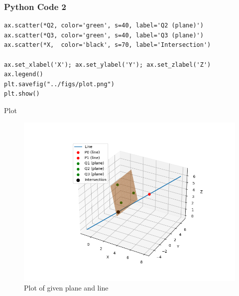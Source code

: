\documentclass{beamer}
\begin{document}
\begin{frame}[fragile]
    \frametitle{Python Code 2}
    \begin{lstlisting}
ax.scatter(*Q2, color='green', s=40, label='Q2 (plane)')
ax.scatter(*Q3, color='green', s=40, label='Q3 (plane)')
ax.scatter(*X,  color='black', s=70, label='Intersection')

ax.set_xlabel('X'); ax.set_ylabel('Y'); ax.set_zlabel('Z')
ax.legend()
plt.savefig("../figs/plot.png")
plt.show()   \end{lstlisting}
\end{frame}

\begin{frame}{Plot}
    \begin{figure}
        \centering
        \includegraphics[width=0.5\columnwidth]{../figs/plot.png}
        \caption{Plot of given plane and line}
        \label{fig:fig}
    \end{figure}
\end{frame}
\end{document}
